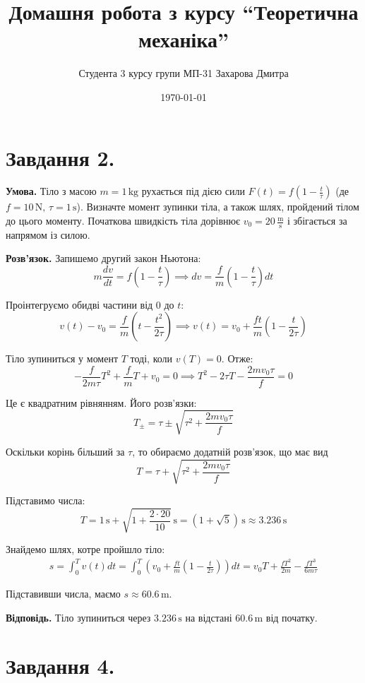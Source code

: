 \documentclass[12pt]{extarticle}
\title{Домашня робота з курсу ``Теоретична механіка''}
\author{Студента 3 курсу групи МП-31 Захарова Дмитра}
\date{\today}
\begin{document}
\maketitle

\section*{Завдання 2.}

\textbf{Умова.} Тіло з масою $m=1 \, \text{kg}$ рухається під дією сили $F(t)=f\left(1-\frac{t}{\tau}\right)$ (де $f=10 \, \text{N}, \, \tau=1 \, \text{s}$). Визначте момент зупинки тіла, а також шлях, пройдений тілом до цього моменту. Початкова швидкість тіла дорівнює $v_0=20 \, \frac{\text{m}}{\text{s}}$ і збігається за напрямом із силою.

\textbf{Розв'язок.} Запишемо другий закон Ньютона:
\[
m \frac{dv}{dt} = f\left(1 - \frac{t}{\tau}\right) \implies dv = \frac{f}{m}\left(1 - \frac{t}{\tau}\right)dt
\]

Проінтегруємо обидві частини від $0$ до $t$:
\[
v(t) - v_0 = \frac{f}{m}\left(t - \frac{t^2}{2\tau}\right) \implies v(t) = v_0 + \frac{ft}{m}\left(1 - \frac{t}{2\tau}\right)
\]

Тіло зупиниться у момент $T$ тоді, коли $v(T)=0$. Отже:
\[
-\frac{f}{2m\tau}T^2 + \frac{f}{m}T + v_0 = 0 \implies T^2 - 2\tau T - \frac{2mv_0\tau}{f} = 0
\]

Це є квадратним рівнянням. Його розв'язки:
\[
T_{\pm} = \tau \pm \sqrt{\tau^2 + \frac{2mv_0\tau}{f}}
\]

Оскільки корінь більший за $\tau$, то обираємо додатній розв'язок, що має вид
\[
T = \tau + \sqrt{\tau^2 + \frac{2mv_0\tau}{f}}
\]

Підставимо числа:
\[
T = 1 \, \text{s} + \sqrt{1 + \frac{2 \cdot 20}{10}} \, \text{s} = (1 + \sqrt{5}) \, \text{s} \approx 3.236 \, \text{s}
\]

Знайдемо шлях, котре пройшло тіло:
\begin{align*}
s = \int_0^T v(t)dt = \int_0^T \left(v_0 + \frac{ft}{m}\left(1 - \frac{t}{2\tau}\right)\right)dt = v_0T + \frac{fT^2}{2m} - \frac{fT^3}{6m\tau}
\end{align*}

Підставивши числа, маємо $s\approx 60.6 \, \text{m}$.

\textbf{Відповідь.} Тіло зупиниться через $3.236 \, \text{s}$ на відстані $60.6 \, \text{m}$ від початку.

\section*{Завдання 4.}
\end{document}
